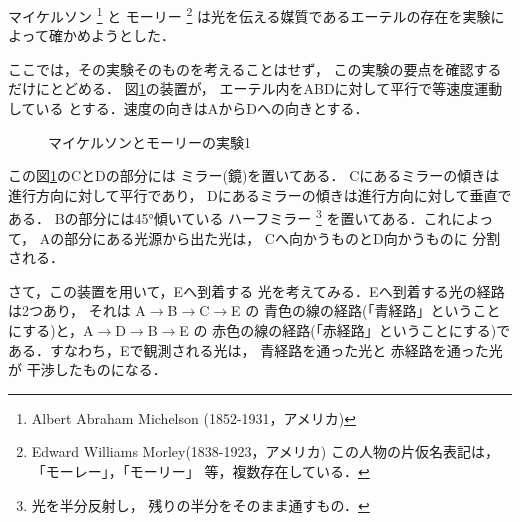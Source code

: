             マイケルソン
                \footnote{
                    Albert Abraham Michelson (1852-1931，アメリカ)
                }
            と
            モーリー
                \footnote{
                    Edward Williams Morley(1838-1923，アメリカ)\;\;
                    この人物の片仮名表記は，「モーレー」，「モーリー」
                            等，複数存在している．
                }
            は光を伝える媒質であるエーテルの存在を実験によって確かめようとした．

            ここでは，その実験そのものを考えることはせず，
            この実験の要点を確認するだけにとどめる．
            図\ref{fig:MM_J}の装置が，
            エーテル内をABDに対して平行で等速度運動している
            とする．速度の向きはAからDへの向きとする．
                \begin{figure}[hbt]
                    \begin{center}
                        \caption{マイケルソンとモーリーの実験1}
                        \label{fig:MM_J}
                    \end{center}
                \end{figure}

            この図\ref{fig:MM_J}のCとDの部分には
            ミラー(鏡)を置いてある．
            Cにあるミラーの傾きは進行方向に対して平行であり，
            Dにあるミラーの傾きは進行方向に対して垂直である．
            Bの部分には45°傾いている
            ハーフミラー
                \footnote{
                        光を半分反射し，
                                残りの半分をそのまま通すもの．
                }
            を置いてある．これによって，
            Aの部分にある光源から出た光は，
            Cへ向かうものとD向かうものに
            分割される．

            さて，この装置を用いて，Eへ到着する
            光を考えてみる．Eへ到着する光の経路は2つあり，
            それは A$\rightarrow$B$\rightarrow$C$\rightarrow$E の
            青色の線の経路(「青経路」ということにする)と，A$\rightarrow$D$\rightarrow$B$\rightarrow$E の
            赤色の線の経路(「赤経路」ということにする)である．すなわち，Eで観測される光は，
            青経路を通った光と
            赤経路を通った光が
            干渉したものになる．

